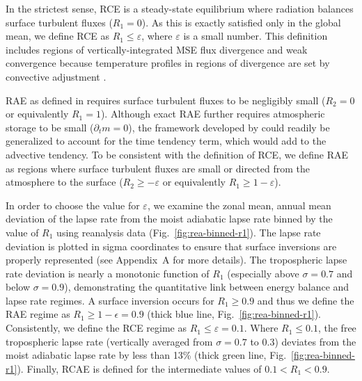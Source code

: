 \documentclass{ametsocV5}
\begin{document}
    In the strictest sense, RCE is a steady-state equilibrium where radiation balances surface turbulent fluxes (\(R_{1}=0\)). As this is exactly satisfied only in the global mean, we define RCE as \(R_{1}\le \varepsilon\), where $\varepsilon$ is a small number. This definition includes regions of vertically-integrated MSE flux divergence and weak convergence because temperature profiles in regions of divergence are set by convective adjustment \citep{warren2020}.

    RAE as defined in \cite{cronin2016} requires surface turbulent fluxes to be negligibly small (\(R_{2}=0\) or equivalently \(R_{1}=1\)). Although exact RAE further requires atmospheric storage to be small ($\partial_t m=0$), the framework developed by \cite{cronin2016} could readily be generalized to account for the time tendency term, which would add to the advective tendency. To be consistent with the definition of RCE, we define RAE as regions where surface turbulent fluxes are small or directed from the atmosphere to the surface (\(R_{2} \ge -\varepsilon \) or equivalently \(R_{1} \ge 1-\varepsilon\)).

    In order to choose the value for $\varepsilon$, we examine the zonal mean, annual mean deviation of the lapse rate from the moist adiabatic lapse rate binned by the value of $R_1$ using reanalysis data (Fig.~\ref{fig:rea-binned-r1}). The lapse rate deviation is plotted in sigma coordinates to ensure that surface inversions are properly represented (see Appendix~A for more details). The tropospheric lapse rate deviation is nearly a monotonic function of $R_1$ (especially above $\sigma=0.7$ and below $\sigma=0.9$), demonstrating the quantitative link between energy balance and lapse rate regimes. A surface inversion occurs for $R_1 \ge 0.9$ and thus we define the RAE regime as $R_1\ge1-\epsilon=0.9$ (thick blue line, Fig.~\ref{fig:rea-binned-r1}). Consistently, we define the RCE regime as $R_1\le\varepsilon=0.1$. Where $R_1\le 0.1$, the free tropospheric lapse rate (vertically averaged from $\sigma=0.7$ to 0.3) deviates from the moist adiabatic lapse rate by less than 13\% (thick green line, Fig.~\ref{fig:rea-binned-r1}). Finally, RCAE is defined for the intermediate values of $0.1<R_1<0.9$.
\end{document}
